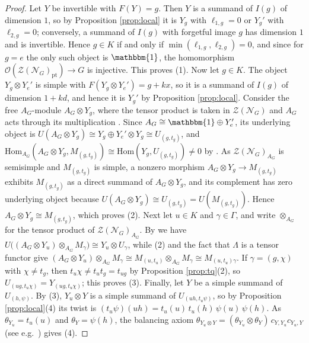 \documentclass[10pt]{article}
\theoremstyle{plain}
\theoremstyle{definition}
\theoremstyle{plain}
\begin{document}
\begin{proof}
Let $Y$ be invertible with $F(Y)=g$. Then $Y$ is a summand of $I(g)$ of dimension $1$, so by Proposition \ref{prop:local} it is $Y_g$ with $\ell_{1,g}=0$ or $Y_g'$ with $\ell_{2,g}=0$; conversely, a summand of $I(g)$ with forgetful image $g$ has dimension $1$ and is invertible. Hence $g\in K$ if and only if $\min(\ell_{1,g},\ell_{2,g})=0$, and since for $g=e$ the only such object is $\mathbbm{1}$, the homomorphism $\mathcal{O}(\mathcal{Z}(\mathcal{N}_G)_\mathrm{pt})\to G$ is injective. This proves (1). Now let $g\in K$. The object $Y_g\otimes Y_e'$ is simple with $F(Y_g\otimes Y_e')=g+kx$, so it is a summand of $I(g)$ of dimension $1+kd$, and hence it is $Y_g'$ by Proposition \ref{prop:local}. Consider the free $A_G$-module $A_G\otimes Y_g$, where the tensor product is taken in $\mathcal{Z}(\mathcal{N}_G)$ and $A_G$ acts through its multiplication \cite[Theorem 1.6]{MR1936496}. Since $A_G\cong\mathbbm{1}\oplus Y'_e$, its underlying object is $U(A_G\otimes Y_g)\cong Y_g\oplus Y_e'\otimes Y_g\cong U_{(g,t_g)}$, and $\mathrm{Hom}_{A_G}(A_G\otimes Y_g,M_{(g,t_g)})\cong\mathrm{Hom}(Y_g,U_{(g,t_g)})\neq0$ by \cite[Theorem 1.6(2)]{MR1936496}. As $\mathcal{Z}(\mathcal{N}_G)_{A_G}$ is semisimple and $M_{(g,t_g)}$ is simple, a nonzero morphism $A_G\otimes Y_g\to M_{(g,t_g)}$ exhibits $M_{(g,t_g)}$ as a direct summand of $A_G\otimes Y_g$, and its complement has zero underlying object because $U(A_G\otimes Y_g)\cong U_{(g,t_g)}=U(M_{(g,t_g)})$. Hence $A_G\otimes Y_g\cong M_{(g,t_g)}$, which proves (2). Next let $u\in K$ and $\gamma\in\Gamma$, and write $\otimes_{A_G}$ for the tensor product of $\mathcal{Z}(\mathcal{N}_G)_{A_G}$. By \cite[Theorem 1.6(4)]{MR1936496} we have $U\bigl((A_G\otimes Y_u)\otimes_{A_G}M_\gamma\bigr)\cong Y_u\otimes U_\gamma$, while (2) and the fact that $\Lambda$ is a tensor functor give $(A_G\otimes Y_u)\otimes_{A_G}M_\gamma\cong M_{(u,t_u)}\otimes_{A_G}M_\gamma\cong M_{(u,t_u)\gamma}$. If $\gamma=(g,\chi)$ with $\chi\neq t_g$, then $t_u\chi\neq t_ut_g=t_{ug}$ by Proposition \ref{prop:tq}(2), so $U_{(ug,t_u\chi)}=Y_{(ug,t_u\chi)}$; this proves (3). Finally, let $Y$ be a simple summand of $U_{(h,\psi)}$. By (3), $Y_u\otimes Y$ is a simple summand of $U_{(uh,t_u\psi)}$, so by Proposition \ref{prop:local}(4) its twist is $(t_u\psi)(uh)=t_u(u)\,t_u(h)\,\psi(u)\,\psi(h)$. As $\theta_{Y_u}=t_u(u)$ and $\theta_Y=\psi(h)$, the balancing axiom $\theta_{Y_u\otimes Y}=(\theta_{Y_u}\otimes\theta_Y)\,c_{Y,Y_u}c_{Y_u,Y}$ (see e.g.\ \cite[Section 8.10]{MR3242743}) gives (4).
\end{proof}
\end{document}
